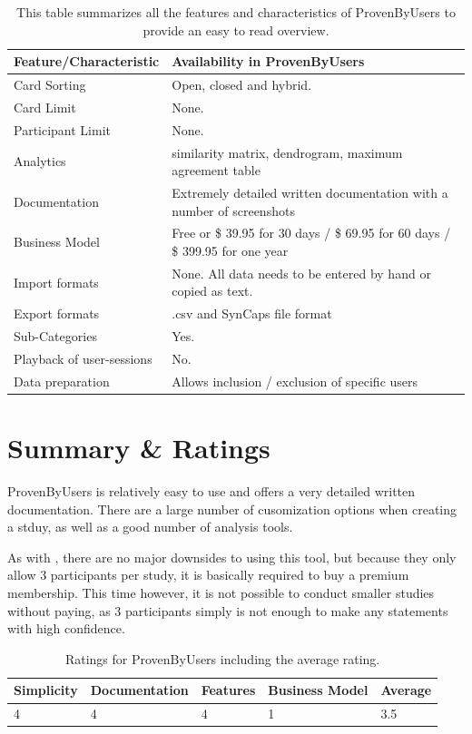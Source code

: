 \begin{table}[tp]
\centering
\begin{tabularx}
{\linewidth}{|l|X|}
\hline \textbf{Feature/Characteristic} & \textbf{Availability in ProvenByUsers} \\ 
\hline Card Sorting & Open, closed and hybrid. \\ 
\hline Card Limit & None. \\
\hline Participant Limit & None. \\
\hline Analytics &  similarity matrix, dendrogram, maximum agreement table\\ 
\hline Documentation & Extremely detailed written documentation with a number 
of screenshots \\
\hline Business Model & Free or  \$ 39.95 for 30 days / \$ 69.95 for 60 days / 
\$ 399.95 for one year\\
\hline Import formats & None. All data needs to be entered by hand or copied as 
text.\\ 
\hline Export formats & .csv and SynCaps file format \\ 
\hline Sub-Categories & Yes. \\ 
\hline Playback of user-sessions & No. \\ 
\hline Data preparation & Allows inclusion / exclusion of specific users \\ 
\hline
\end{tabularx} 
\caption[Feature summary of ProvenByUsers] 
{ 
This table summarizes all the features and characteristics of ProvenByUsers
to provide an easy to read overview.
}
\label{tab:features-ProvenByUsers}
\end{table}

\section{Summary \& Ratings}
ProvenByUsers is relatively easy to use and offers a very detailed written 
documentation. There are a large number of cusomization options when creating a 
stduy, as well as a good number of analysis tools. 

As with \textcite{UXtweak}, there are no major downsides to using this tool, but
because they only allow 3 participants per study, it is basically required to 
buy a premium membership. This time however, it is not possible to conduct 
smaller studies without paying, as 3 participants simply is not enough to make 
any statements with high confidence.


\begin{table}[tp] 
\centering 
\begin{tabularx}{\linewidth}{|X|X|X|X|X|}
\hline
Simplicity & Documentation & Features & Business Model & Average \\ 
\hline 
4 & 4 & 4 & 1 & 3.5 \\ 
\hline 
\end{tabularx} 
\caption[Ratings for ProvenByUsers] {
Ratings for ProvenByUsers including the average rating.
} 
\label{tab:rating-ProvenByUsers}
\end{table}



